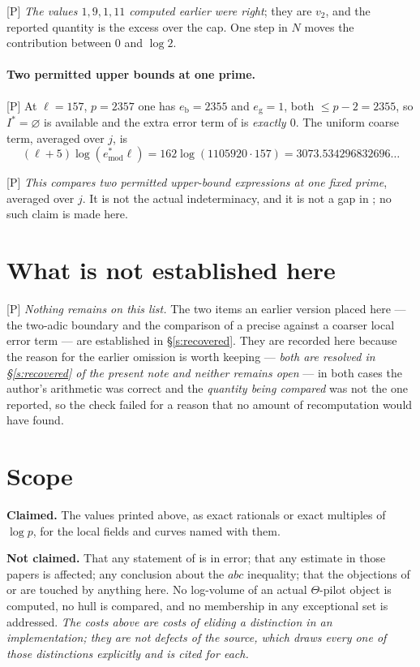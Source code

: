 \documentclass[11pt]{article}
\theoremstyle{plain}
\theoremstyle{definition}
\begin{document}
\textup{[P]} \emph{The values $1,9,1,11$ computed earlier were right}; they are $v_2$,
and the reported quantity is the excess over the cap.  One step in $N$ moves the
contribution between $0$ and $\log2$.

\paragraph{Two permitted upper bounds at one prime.}
\textup{[P]} At $\ell=157$, $p=2357$ one has $e_{\mathrm b}=2355$ and
$e_{\mathrm g}=1$, both $\le p-2=2355$, so $I^{*}=\varnothing$ is available and the
extra error term of \cite[Prop.~1.4(iii)]{IUT4} is \emph{exactly $0$}.  The uniform
coarse term, averaged over $j$, is
\[
 (\ell+5)\log(e^{*}_{\mathrm{mod}}\ell)=162\log(1105920\cdot157)
 =3073.534296832696\ldots
\]

\textup{[P]} \emph{This compares two permitted upper-bound expressions at one fixed
prime}, averaged over $j$.  It is not the actual indeterminacy, and it is not a gap in
\cite[Cor.~3.12]{IUT3}; no such claim is made here.

\section{What is not established here}\label{s:notdone}

\textup{[P]} \emph{Nothing remains on this list.}  The two items an earlier version
placed here --- the two-adic boundary and the comparison of a precise against a coarser
local error term --- are established in \S\ref{s:recovered}.  They are recorded here
because the reason for the earlier omission is worth keeping --- \emph{both are
resolved in \S\ref{s:recovered} of the present note and neither remains open} --- in
both cases the author's arithmetic was correct and the \emph{quantity being compared}
was not the one reported, so the check failed for a reason that no amount of
recomputation would have
found.

\section{Scope}\label{s:scope}

\noindent\textbf{Claimed.}  The values printed above, as exact rationals or exact
multiples of $\log p$, for the local fields and curves named with them.

\smallskip\noindent\textbf{Not claimed.}  That any statement of \cite{IUT1,IUT3,IUT4} is
in error; that any estimate in those papers is affected; any conclusion about the $abc$ inequality; that the
objections of \cite{SS} or \cite[Cor.~3.12]{IUT3} are touched by anything here.  No
log-volume of an actual $\Theta$-pilot object is computed, no hull is compared, and no
membership in any exceptional set is addressed.  \emph{The costs above are costs of
eliding a distinction in an implementation; they are not defects of the source, which
draws every one of those distinctions explicitly and is cited for each.}
\end{document}
